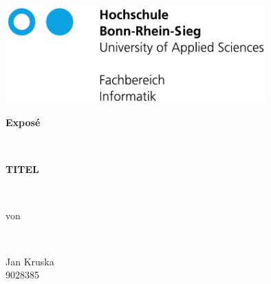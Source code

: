 \documentclass[12pt]{article}
\begin{document}

\begin{titlepage}


  \begin{minipage}[t]{10cm}
  \includegraphics[width=10cm]{h-logo-full-font-embed}\\
  \end{minipage}
  \vspace{2.5cm}

	\begin{center}

    \vspace{0.8cm}

    \vspace{3cm}
    \begin{Huge}
    \textbf{Exposé}\end{Huge}\\
    \vspace{0.8cm}
  	\begin{huge}
  	\textbf{TITEL}
  	\end{huge}
  	 \vspace{0.6cm} \\
  	  	  \begin{large}von
  	  \end{large}
  	  \\ \begin{LARGE}
  	   \vspace{0.6cm}
  	  {Jan Kruska}\\
  	  9028385\\
  	  \vspace{0.8cm}
  	 
  	\end{LARGE}
  	
    \vspace{3.0cm}
			\end{center}
	\begin{large}


\end{large}
\end{titlepage}
\end{document}
